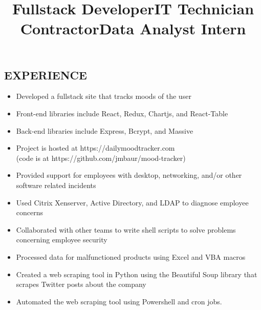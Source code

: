 \documentclass[margin]{res}
\begin{document}
\begin{resume}
\section{EXPERIENCE}

\title{\textbf{Fullstack Developer}}
\begin{position}
    \begin{itemize}
        \item Developed a fullstack site that tracks moods of the user
        \item Front-end libraries include React, Redux, Chartjs, and React-Table
        \item Back-end libraries include Express, Bcrypt, and Massive
        \item Project is hosted at https://dailymoodtracker.com\\(code is at https://github.com/jmbaur/mood-tracker)
    \end{itemize}
\end{position}

\title{\textbf{IT Technician} Contractor}
\begin{position}
	\begin{itemize}
        \item Provided support for employees with desktop, networking, and/or other software related incidents
        \item Used Citrix Xenserver, Active Directory, and LDAP to diagnose employee concerns
        \item Collaborated with other teams to write shell scripts to solve problems concerning employee security
	\end{itemize}
\end{position}

\title{\textbf{Data Analyst} Intern}
\begin{position}
	\begin{itemize}
        \item Processed data for malfunctioned products using Excel and VBA macros
        \item Created a web scraping tool in Python using the Beautiful Soup library that scrapes Twitter posts about the company
        \item Automated the web scraping tool using Powershell and cron jobs.
	\end{itemize}
\end{position}


\end{resume}
\end{document}
